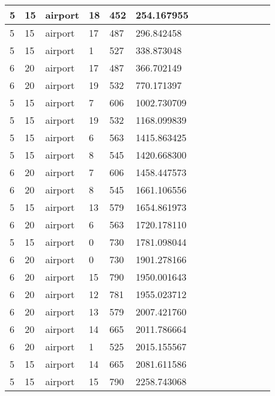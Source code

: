 \documentclass[../thesis.tex]{subfiles}
\begin{document}
\begin{table}[!ht]
\begin{tabularx}{\textwidth}{|X|X|X|X|X|X|X|X|X|X|X|X|X|X|}
        5 & 15 & airport & 18 & 452 & 254.167955 \\ \hline
        5 & 15 & airport & 17 & 487 & 296.842458 \\ \hline
        5 & 15 & airport & 1 & 527 & 338.873048 \\ \hline
        6 & 20 & airport & 17 & 487 & 366.702149 \\ \hline
        6 & 20 & airport & 19 & 532 & 770.171397 \\ \hline
        5 & 15 & airport & 7 & 606 & 1002.730709 \\ \hline
        5 & 15 & airport & 19 & 532 & 1168.099839 \\ \hline
        5 & 15 & airport & 6 & 563 & 1415.863425 \\ \hline
        5 & 15 & airport & 8 & 545 & 1420.668300 \\ \hline
        6 & 20 & airport & 7 & 606 & 1458.447573 \\ \hline
        6 & 20 & airport & 8 & 545 & 1661.106556 \\ \hline
        5 & 15 & airport & 13 & 579 & 1654.861973 \\ \hline
        6 & 20 & airport & 6 & 563 & 1720.178110 \\ \hline
        5 & 15 & airport & 0 & 730 & 1781.098044 \\ \hline
        6 & 20 & airport & 0 & 730 & 1901.278166 \\ \hline
        6 & 20 & airport & 15 & 790 & 1950.001643 \\ \hline
        6 & 20 & airport & 12 & 781 & 1955.023712 \\ \hline
        6 & 20 & airport & 13 & 579 & 2007.421760 \\ \hline
        6 & 20 & airport & 14 & 665 & 2011.786664 \\ \hline
        6 & 20 & airport & 1 & 525 & 2015.155567 \\ \hline
        5 & 15 & airport & 14 & 665 & 2081.611586 \\ \hline
        5 & 15 & airport & 15 & 790 & 2258.743068 \\ \hline
    \end{tabularx}
    \end{table}
    
\end{document}
